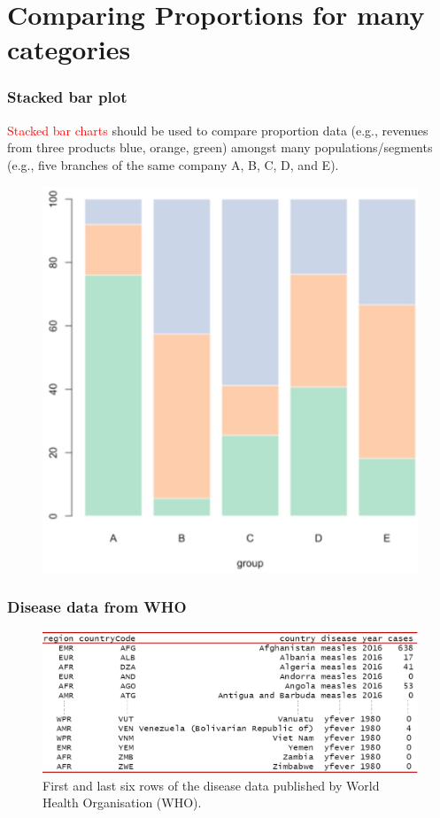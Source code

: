 \documentclass{beamer}
\begin{document}
\section{Comparing Proportions for many categories}
\begin{frame}\frametitle{Stacked bar plot}
\textcolor{red}{Stacked bar charts} should be used to compare proportion data (e.g., revenues from three products blue, orange, green) amongst many populations/segments (e.g., five branches of the same company A, B, C, D, and E).
\begin{figure}
\includegraphics[width=0.50\linewidth]{PlotsLec1/StackedBarExample}
\end{figure}
\end{frame}

%

\begin{frame}\frametitle{Disease data from WHO}
\begin{figure}
\includegraphics[width=0.99\linewidth]{PlotsLec1/DiseasePeek}
\caption{First and last six rows of the disease data published by World Health Organisation (WHO).}
\end{figure}
\end{frame}
\end{document}
